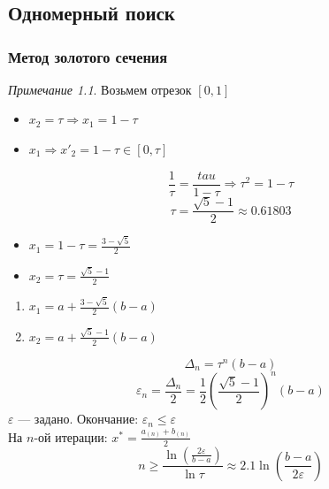 \documentclass[oneside]{book}
\theoremstyle{plain}
\theoremstyle{remark}
\newtheorem*{remark}{Примечание}
\theoremstyle{definition}
\begin{document}
\chapter{}
\label{sec:org5702f9b}
\section{Одномерный поиск}
\label{sec:org410062c}
\subsection{Метод золотого сечения}
\label{sec:org9dc501e}
\begin{remark}
Возьмем отрезок \([0, 1]\)
\begin{itemize}
\item \(x_2 = \tau \Rightarrow x_1 = 1 - \tau\)
\item \(x_1 \Rightarrow x'_2 = 1 - \tau \in [0, \tau]\)
\end{itemize}
\[ \frac{1}{\tau} = \frac{tau}{1 - \tau} \Rightarrow \tau^2 = 1 - \tau\]
\[ \tau = \frac{\sqrt{5} - 1}{2} \approx 0.61803 \]
\begin{itemize}
\item \(x_1 = 1 - \tau = \frac{3 - \sqrt{5}}{2}\)
\item \(x_2 = \tau = \frac{\sqrt{5} - 1}{2}\)
\end{itemize}
\end{remark}
\begin{enumerate}
\item \label{x_1_3} \(x_1 = a + \frac{3 - \sqrt{5}}{2}(b - a)\)
\item \label{x_2_3} \(x_2 = a + \frac{\sqrt{5} - 1}{2}(b - a)\)
\end{enumerate}
\[ \Delta_n = \tau^n(b - a) \]
\[ \varepsilon_n = \frac{\Delta_n}{2} = \frac{1}{2}\left(\frac{\sqrt{5} - 1}{2}\right)^n(b - a) \]
\(\varepsilon\) --- задано. Окончание: \(\varepsilon_n \le \varepsilon\) \\
На \(n\text{-ой}\) итерации: \(x^* = \frac{a_{(n)} + b_{(n)}}{2}\) \\
\[ n \ge \frac{\ln\left(\frac{2\varepsilon}{b - a}\right)}{\ln \tau} \approx 2.1 \ln\left(\frac{b - a}{2\varepsilon}\right) \]
\end{document}
